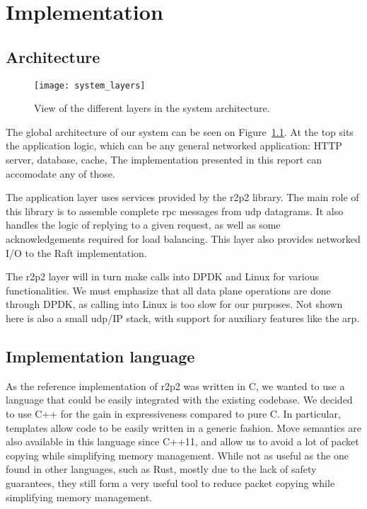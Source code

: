 \chapter{Implementation}
\label{chap:implementation}

\section{Architecture}

\begin{figure}
    \centering
    \texttt{[image: system\_layers]}
    \caption{View of the different layers in the system architecture.
    \label{fig:architecture}
    }
\end{figure}

The global architecture of our system can be seen on Figure~\ref{fig:architecture}.
At the top sits the application logic, which can be any general networked application: HTTP server, database, cache, \etc
The implementation presented in this report can accomodate any of those.

The application layer uses services provided by the \gls{r2p2} library.
The main role of this library is to assemble complete \gls{rpc} messages from \gls{udp} datagrams.
It also handles the logic of replying to a given request, as well as some acknowledgements required for load balancing.
This layer also provides networked I/O to the Raft implementation.

The \gls{r2p2} layer will in turn make calls into DPDK and Linux for various functionalities.
We must emphasize that all data plane operations are done through DPDK, as calling into Linux is too slow for our purposes.
Not shown here is also a small \gls{udp}/IP stack, with support for auxiliary features like the \gls{arp}.


\section{Implementation language}

As the reference implementation of \gls{r2p2} was written in C, we wanted to use a language that could be easily integrated with the existing codebase.
We decided to use C++ for the gain in expressiveness compared to pure C.
In particular, templates allow code to be easily written in a generic fashion.
Move semantics are also available in this language since C++11, and allow us to avoid a lot of packet copying while simplifying memory management.
While not as useful as the one found in other languages, such as Rust, mostly due to the lack of safety guarantees, they still form a very useful tool to reduce packet copying while simplifying memory management.

